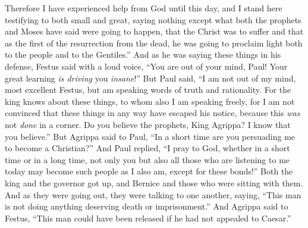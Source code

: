 \begin{biblechapter}
\verse Therefore I have experienced help from God until this day, and I stand here testifying to both small and great, saying nothing except what both the prophets and Moses have said were going to happen,
\verse that the Christ was to suffer and that as the first of the resurrection from the dead, he was going to proclaim light both to the people and to the Gentiles.”
\verse And as he was saying these things in his defense, Festus said with a loud voice, “You are out of your mind, Paul! Your great learning \textit{is driving} you \textit{insane}!”
\verse But Paul said, “I am not out of my mind, most excellent Festus, but am speaking words of truth and rationality.
\verse For the king knows about these things, to whom also I am speaking freely, for I am not convinced that these things in any way have escaped his notice, because this \textit{was} not \textit{done} in a corner.
\verse Do you believe the prophets, King Agrippa? I know that you believe.”
\verse But Agrippa said to Paul, “In a short time are you persuading me to become a Christian?”
\verse And Paul replied, “I pray to God, whether in a short time or in a long time, not only you but also all those who are listening to me today may become such people as I also am, except for these bonds!”
\verse Both the king and the governor got up, and Bernice and those who were sitting with them.
\verse And as they were going out, they were talking to one another, saying, “This man is not doing anything deserving death or imprisonment.”
\verse And Agrippa said to Festus, “This man could have been released if he had not appealed to Caesar.”
\end{biblechapter}

